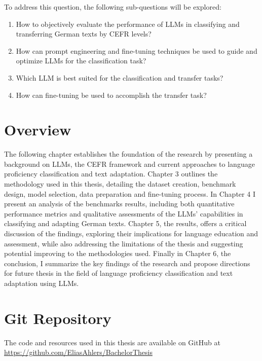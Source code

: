 To address this question, the following sub-questions will be explored:

\begin{enumerate}
    \item How to objectively evaluate the performance of LLMs in classifying and transferring German texts by CEFR levels?
    \item How can prompt engineering and fine-tuning techniques be used to guide and optimize LLMs for the classification task?
    \item Which LLM is best suited for the classification and transfer tasks?
    \item How can fine-tuning be used to accomplish the transfer task?
\end{enumerate}

\section{Overview}
\label{s:overview}
The following chapter establishes the foundation of the research by presenting a background on LLMs, the CEFR framework and current approaches to language proficiency classification and text adaptation. Chapter 3 outlines the methodology used in this thesis, detailing the dataset creation, benchmark design, model selection, data preparation and fine-tuning process. In Chapter 4 I present an analysis of the benchmarks results, including both quantitative performance metrics and qualitative assessments of the LLMs' capabilities in classifying and adapting German texts. Chapter 5, the results, offers a critical discussion of the findings, exploring their implications for language education and assessment, while also addressing the limitations of the thesis and suggesting potential improving to the methodologies used. Finally in Chapter 6, the conclusion, I summarize the key findings of the research and propose directions for future thesis in the field of language proficiency classification and text adaptation using LLMs.

\section{Git Repository}
\label{s:git_repo}
The code and resources used in this thesis are available on GitHub at \\
\href{https://github.com/EliasAhlers/BachelorThesis}{https://github.com/EliasAhlers/BachelorThesis}